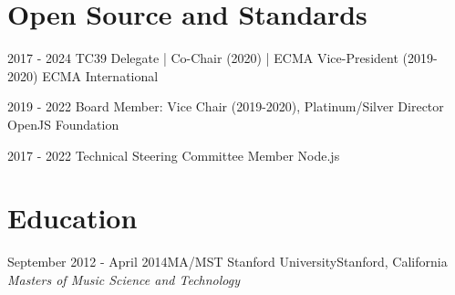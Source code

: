 \documentclass[10pt,a4paper,sans]{moderncv}   %
\begin{document}
%



\section{Open Source and Standards}

\cventry
  {2017 - 2024}
  {TC39 Delegate | Co-Chair (2020) | ECMA Vice-President (2019-2020)}
  {ECMA International}
  {}{}
  {
  }

\cventry
  {2019 - 2022}
  {Board Member: Vice Chair (2019-2020), Platinum/Silver Director}
  {OpenJS Foundation}
  {}{}
  {
  }

\cventry
  {2017 - 2022}
  {Technical Steering Committee Member}
  {Node.js}
  {}{}
  {
  }

\section{Education}

\cventry
  {September 2012 - April 2014}{MA/MST}
  {Stanford University}{Stanford, California}
  {\textit{Masters of Music Science and Technology}}
  {}
\end{document}
